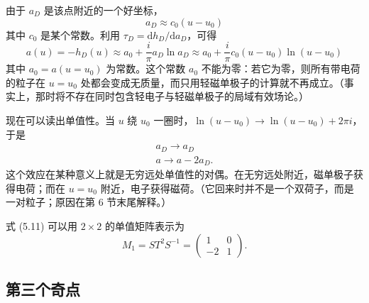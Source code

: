\documentclass[11pt,a4paper,UTF8,fontset=fandol]{ctexart}
\theoremstyle{plain}
\theoremstyle{definition}
\begin{document}
由于 $a_D$ 是该点附近的一个好坐标，
\begin{equation}
    a_D \approx c_0(u-u_0) \tag{5.9}
\end{equation}
其中 $c_0$ 是某个常数。利用 $\tau_D=\mathrm{d}h_D/\mathrm{d}a_D$，可得
\begin{equation}
    a(u)=-h_D(u)\approx a_0+\frac{i}{\pi}a_D\ln a_D\approx a_0+\frac{i}{\pi}c_0(u-u_0)\ln(u-u_0) \tag{5.10}
\end{equation}
其中 $a_0=a(u=u_0)$ 为常数。这个常数 $a_0$ 不能为零：若它为零，则所有带电荷的粒子在 $u=u_0$ 处都会变成无质量，而只用轻磁单极子的计算就不再成立。（事实上，那时将不存在同时包含轻电子与轻磁单极子的局域有效场论。）

现在可以读出单值性。当 $u$ 绕 $u_0$ 一圈时，$\ln(u-u_0)\to\ln(u-u_0)+2\pi i$，于是
\begin{equation}
\begin{gathered}
    a_D \to a_D\\
    a \to a-2a_D.
\end{gathered}
\tag{5.11}
\end{equation}
这个效应在某种意义上就是无穷远处单值性的对偶。在无穷远处附近，磁单极子获得电荷；而在 $u=u_0$ 附近，电子获得磁荷。（它回来时并不是一个双荷子，而是一对粒子；原因在第 6 节末尾解释。）

式 (5.11) 可以用 $2\times 2$ 的单值矩阵表示为
\begin{equation}
    M_1 = S T^2 S^{-1} = \begin{pmatrix} 1 & 0 \\ -2 & 1 \end{pmatrix}. \tag{5.12}
\end{equation}

\subsection{第三个奇点}
\end{document}
